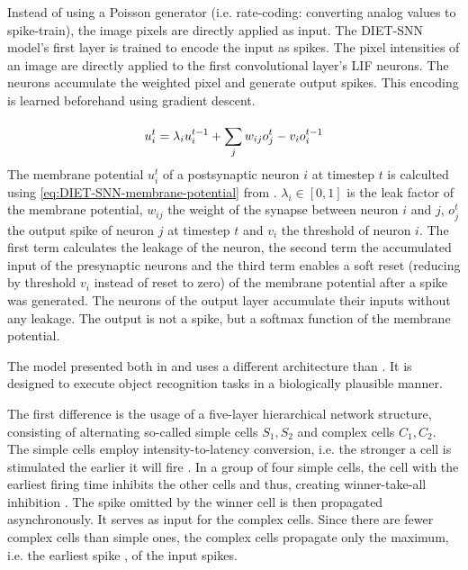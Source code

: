 Instead of using a Poisson generator (i.e. rate-coding: converting analog values to spike-train), the image pixels are directly applied as input.
The \ac{DIET}-\ac{SNN} model's first layer is trained to encode the input as spikes.
The pixel intensities of an image are directly applied to the first convolutional layer's \ac{LIF} neurons.
The neurons accumulate the weighted pixel and generate output spikes.
This encoding is learned beforehand using gradient descent.

\begin{equation}
    \centering
    \label{eq:DIET-SNN-membrane-potential}
    u_i^t = \lambda_i u_i^{t-1} + \sum_{j}^{}w_{ij}o_j^t-v_{i}o_i^{t-1}
\end{equation}
%
The membrane potential $u_i^t$ of a postsynaptic neuron $i$ at timestep $t$ 
is calculted using \autoref{eq:DIET-SNN-membrane-potential} from \cite{DIET_SNN}. 
$\lambda_i \in [0,1]$ is the leak factor of the membrane potential, 
$w_{ij}$ the weight of the synapse between neuron $i$ and $j$, 
$o_j^t$ the output spike of neuron $j$ at timestep $t$ and 
$v_i$ the threshold of neuron $i$.
The first term calculates the leakage of the neuron,
the second term the accumulated input of the presynaptic neurons and
the third term enables a soft reset (reducing by threshold $v_i$ instead of reset to zero) of the membrane potential after a spike was generated.
The neurons of the output layer accumulate their inputs without any leakage.
The output is not a spike, but a softmax function of the membrane potential.

The model presented both in \cite{multi_scale_STDP} and \cite{STDP_vis_feat} uses a different architecture than \cite{SNN}.
It is designed to execute object recognition tasks in a biologically plausible manner.

The first difference is the usage of a five-layer hierarchical network structure, consisting of alternating so-called simple cells $S_1, S_2$ and complex cells $C_1, C_2$.
The simple cells employ intensity-to-latency conversion, i.e. the stronger a cell is stimulated the earlier it will fire \cite{STDP_vis_feat}.
In a group of four simple cells, the cell with the earliest firing time inhibits the other cells and thus, creating winner-take-all inhibition \cite{multi_scale_STDP}.
The spike omitted by the winner cell is then propagated asynchronously.
It serves as input for the complex cells.
Since there are fewer complex cells than simple ones, the complex cells propagate only the maximum, i.e. the earliest spike \cite{STDP_vis_feat}, of the input spikes.

